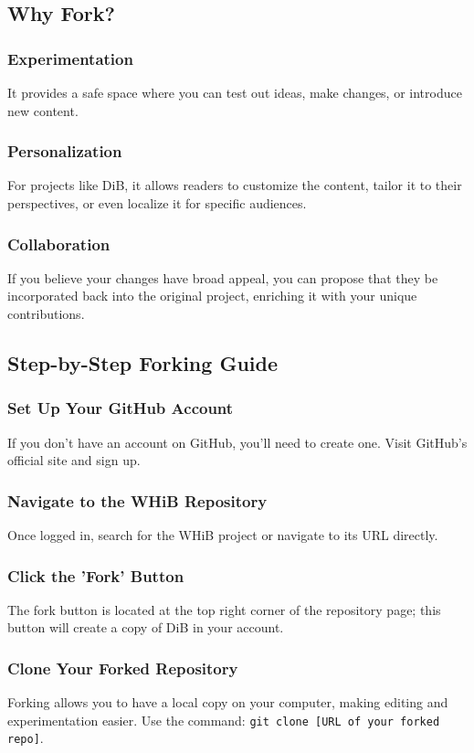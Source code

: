 \documentclass{book}
\begin{document}
\subsection*{Why Fork?}
\subsubsection*{Experimentation}
It provides a safe space where you can test out ideas, make changes, or introduce new content.

\subsubsection*{Personalization}
For projects like DiB, it allows readers to customize the content, tailor it to their perspectives, or even localize it for specific audiences.

\subsubsection*{Collaboration}
If you believe your changes have broad appeal, you can propose that they be incorporated back into the original project, enriching it with your unique contributions.

\subsection*{Step-by-Step Forking Guide}
\subsubsection*{Set Up Your GitHub Account}
If you don't have an account on GitHub, you'll need to create one. Visit GitHub's official site and sign up.

\subsubsection*{Navigate to the WHiB Repository}
Once logged in, search for the WHiB project or navigate to its URL directly.

\subsubsection*{Click the 'Fork' Button}
The fork button is located at the top right corner of the repository page; this button will create a copy of DiB in your account.

\subsubsection*{Clone Your Forked Repository}
Forking allows you to have a local copy on your computer, making editing and experimentation easier. Use the command: \texttt{git clone [URL of your forked repo]}.
\end{document}
